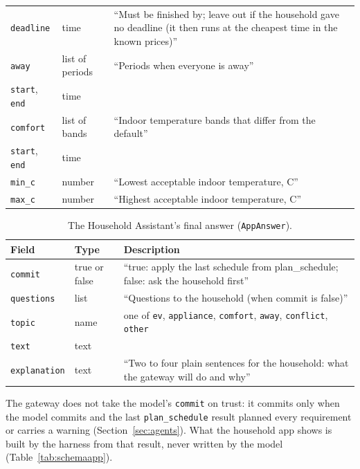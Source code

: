 \documentclass[12pt,a4paper]{report}
\begin{document}
\begin{table}[htbp]
\begin{tabularx}{\textwidth}{@{}>{\raggedright\arraybackslash}p{3.3cm}>{\raggedright\arraybackslash}p{2.4cm}X@{}}
\quad\texttt{deadline} & time & ``Must be finished by; leave out if the household gave no deadline (it then runs at the cheapest time in the known prices)'' \\
\texttt{away} & list of periods & ``Periods when everyone is away'' \\
\quad\texttt{start}, \texttt{end} & time & \\
\texttt{comfort} & list of bands & ``Indoor temperature bands that differ from the default'' \\
\quad\texttt{start}, \texttt{end} & time & \\
\quad\texttt{min\_c} & number & ``Lowest acceptable indoor temperature, C'' \\
\quad\texttt{max\_c} & number & ``Highest acceptable indoor temperature, C'' \\
\bottomrule
\end{tabularx}
\end{table}

\begin{table}[htbp]
\caption{The Household Assistant's final answer (\texttt{AppAnswer}).}
\label{tab:schemaanswer}
\small
\begin{tabularx}{\textwidth}{@{}>{\raggedright\arraybackslash}p{3.3cm}>{\raggedright\arraybackslash}p{2.4cm}X@{}}
\toprule
Field & Type & Description \\
\midrule
\texttt{commit} & true or false & ``true: apply the last schedule from plan\_schedule; false: ask the household first'' \\
\texttt{questions} & list & ``Questions to the household (when commit is false)'' \\
\quad\texttt{topic} & name & one of \texttt{ev}, \texttt{appliance}, \texttt{comfort}, \texttt{away}, \texttt{conflict}, \texttt{other} \\
\quad\texttt{text} & text & \\
\texttt{explanation} & text & ``Two to four plain sentences for the household: what the gateway will do and why'' \\
\bottomrule
\end{tabularx}
\end{table}

The gateway does not take the model's \texttt{commit} on trust: it
commits only when the model commits and the last
\texttt{plan\_schedule} result planned every requirement or carries a
warning (Section~\ref{sec:agents}). What the household app shows is
built by the harness from that result, never written by the model
(Table~\ref{tab:schemaapp}).
\end{document}
